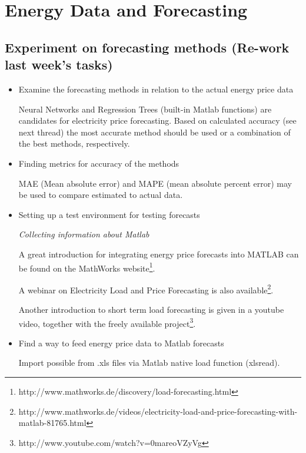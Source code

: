 \documentclass[a4paper]{article}
\begin{document}
\vspace{1em}

\hfill\date{Week 17, from 21.04. to 27.04.}

\section{Energy Data and Forecasting}

\subsection{Experiment on forecasting methods (Re-work last week's tasks)}

\begin{itemize}

\item Examine the forecasting methods in relation to the actual energy price data

Neural Networks and Regression Trees (built-in Matlab functions) are candidates for 
electricity price forecasting. Based on calculated accuracy (see next thread) 
the most accurate method should be used or a combination of the best methods, respectively. 

\item Finding metrics for accuracy of the methods

MAE (Mean absolute error) and MAPE (mean absolute percent error) may be used to 
compare estimated to actual data. 

\item Setting up a test environment for testing forecasts

\subitem \emph{Collecting information about Matlab}

A great introduction for integrating energy price forecasts into MATLAB can be found on the MathWorks website\footnote{http://www.mathworks.de/discovery/load-forecasting.html}. 

A webinar on Electricity Load and Price Forecasting is also available\footnote{http://www.mathworks.de/videos/electricity-load-and-price-forecasting-with-matlab-81765.html}.

Another introduction to short term load forecasting is given in a youtube video, together with the freely available project\footnote{http://www.youtube.com/watch?v=0mareoVZyVg}.


\item Find a way to feed energy price data to Matlab forecasts

Import possible from .xls files via Matlab native load function (xlsread). 


\end{itemize}
\end{document}
